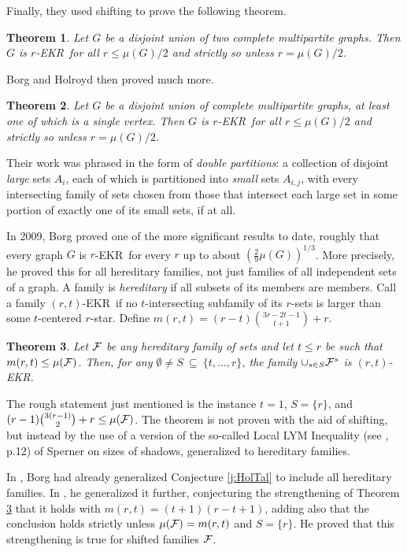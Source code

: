 \documentclass{article}
\newtheorem{thm}{Theorem}%
\def\m{{\mu}}
\def\cF{{\cal F}}
\def\ekr{{\sf EKR}}
\def\mt{{\emptyset}}
\def\sse{{\subseteq}}
\begin{document}
Finally, they used shifting to prove the following theorem.

\begin{thm}
\label{t:TwoCompBip}
Let $G$ be a disjoint union of two complete multipartite graphs.
Then $G$ is $r$-\ekr\ for all $r\le \m(G)/2$ and strictly so unless $r=\m(G)/2$.
\end{thm}

Borg and Holroyd \cite{BorgHolrDouble} then proved much more.

\begin{thm}
\label{t:ManyCompBip}
Let $G$ be a disjoint union of complete multipartite graphs, at least one of which is a single vertex.
Then $G$ is $r$-\ekr\ for all $r\le \m(G)/2$ and strictly so unless $r=\m(G)/2$.
\end{thm}

Their work was phrased in the form of {\it double partitions}: a collection of disjoint {\it large} sets $A_i$, each of which is partitioned into {\it small} sets $A_{i,j}$, with every intersecting family of sets chosen from those that intersect each large set in some portion of exactly one of its small sets, if at all.

In 2009, Borg \cite{BorgExt} proved one of the more significant results to date, roughly that every graph $G$ is $r$-\ekr\ for every $r$ up to about $(\frac{2}{9}\m(G))^{1/3}$.
More precisely, he proved this for all hereditary families, not just families of all independent sets of a graph.
A family is {\it hereditary} if all subsets of its members are members.
Call a family $(r,t)$-\ekr\ if no $t$-intersecting subfamily of its $r$-sets is larger than some $t$-centered $r$-star.
Define $m(r,t)=(r-t)\binom{3r-2t-1}{t+1}+r$.

\begin{thm}
\label{t:Hered}
Let $\cF$ be any hereditary family of sets and let $t\le r$ be such that $m(r,t)\le\m(\cF)$.
Then, for any $\mt\not=S\ \sse\ \{t,\ldots,r\}$, the family $\cup_{s\in S}\cF^s$ is $(r,t)$-\ekr.
\end{thm}

The rough statement just mentioned is the instance $t=1$, $S=\{r\}$, and $(r-1)\binom{3(r-1)}{2}+r\le\m(\cF)$.
The theorem is not proven with the aid of shifting, but instead by the use of a version of the so-called Local LYM Inequality (see \cite{BollobasBook}, p.12) of Sperner \cite{Sperner} on sizes of shadows, generalized to hereditary families.

In \cite{BorgThesis}, Borg had already generalized Conjecture \ref{j:HolTal} to include all hereditary families.
In \cite{BorgExt}, he generalized it further, conjecturing the strengthening of Theorem \ref{t:Hered} that it holds with $m(r,t)=(t+1)(r-t+1)$, adding also that the conclusion holds strictly unless $\m(\cF)=m(r,t)$ and $S=\{r\}$.
He proved that this strengthening is true for shifted families $\cF$.
\end{document}
